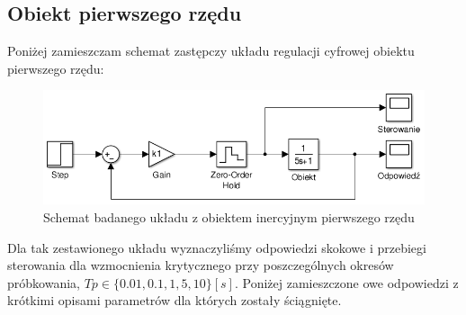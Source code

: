 \documentclass[12pt]{article}
\begin{document}
\subsection{Obiekt pierwszego rzędu}

Poniżej zamieszczam schemat zastępczy układu regulacji cyfrowej obiektu
pierwszego rzędu:

\begin{figure}[!htb]
	\begin{center}
		\includegraphics[width=14cm]{../res/img/schd1.png} 
	\end{center}
	\caption{Schemat badanego układu z obiektem inercyjnym pierwszego rzędu}
\end{figure}

Dla tak zestawionego układu wyznaczyliśmy odpowiedzi skokowe i przebiegi
sterowania dla wzmocnienia krytycznego przy poszczególnych okresów próbkowania,
$Tp\in \{0.01, 0.1, 1, 5, 10\}[s]$. Poniżej zamieszczone owe odpowiedzi z
krótkimi opisami parametrów dla których zostały ściągnięte.

\newpage
\end{document}
